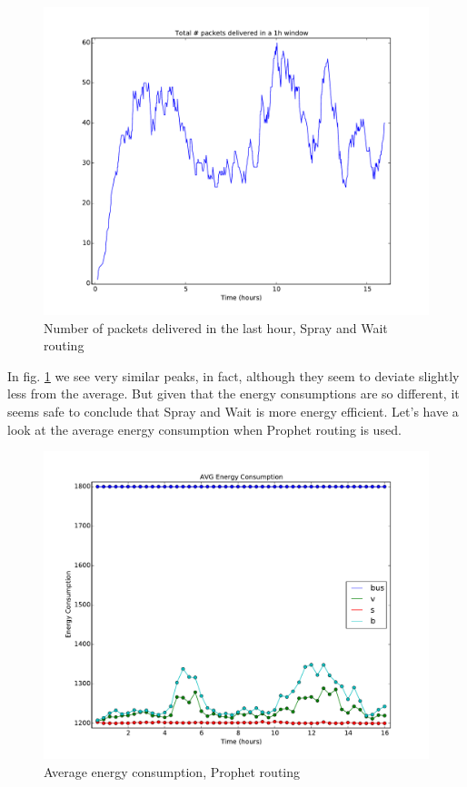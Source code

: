 \documentclass[conference]{IEEEtran}
\begin{document}
\begin{figure}
  \includegraphics[scale=0.25, center]{../one_1.5.1-RC2/plots/SprayAndWait_NUM_DELIVERED_PKTS_IN_WND.pdf}
  \caption{Number of packets delivered in the last hour, Spray and Wait routing}
  \label{fig:pkts_in_wnd:snw}
\end{figure}

In fig. \ref{fig:pkts_in_wnd:snw} we see very similar peaks, in fact, although they seem to deviate slightly less from the average. But given that the energy consumptions are so different, it seems safe to conclude that Spray and Wait is more energy efficient. Let's have a look at the average energy consumption when Prophet routing is used.

\begin{figure}
  \includegraphics[scale=0.25, center]{../one_1.5.1-RC2/plots/ProphetRouter_AVG_ENERGY_CONSUMPTION.pdf}
  \caption{Average energy consumption, Prophet routing}
  \label{fig:avg_consumpt:prophet}
\end{figure}
\end{document}
